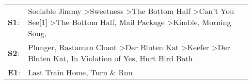 \begin{supertabular}{p{0.03\textwidth}p{0.92\textwidth}}
 \textbf{S1}:  &  Sociable Jimmy\textsuperscript{} \textgreater \enspace Sweetness\textsuperscript{} \textgreater \enspace The Bottom Half\textsuperscript{} \textgreater \enspace Can't You See[1]\textsuperscript{} \textgreater \enspace The Bottom Half\textsuperscript{}, \enspace Mail Package\textsuperscript{} \textgreater \enspace Kimble\textsuperscript{}, \enspace Morning Song\textsuperscript{}, \textsuperscript{}  \enspace  \\
 \textbf{S2}:  &                                                                                                   Plunger\textsuperscript{}, \enspace Rastaman Chant\textsuperscript{} \textgreater \enspace Der Bluten Kat\textsuperscript{} \textgreater \enspace Keefer\textsuperscript{} \textgreater \enspace Der Bluten Kat\textsuperscript{}, \enspace In Violation of Yes\textsuperscript{}, \enspace Hurt Bird Bath\textsuperscript{}  \enspace  \\
 \textbf{E1}:  &                                                                                                                                                                                                                                                                                                                                                      Last Train Home\textsuperscript{}, \enspace Turn \& Run\textsuperscript{}  \enspace  \\
\end{supertabular}
